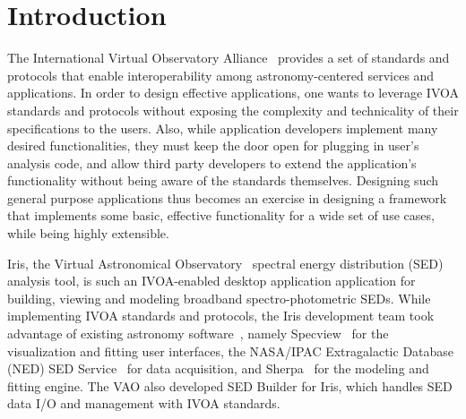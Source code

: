 \documentclass[5p]{elsarticle}
\begin{document}
\section{Introduction}
The International Virtual Observatory Alliance~\citep[IVOA;][]{2004SPIE.5493..137Q} provides a set of standards and protocols that enable interoperability among astronomy-centered services and applications. In order to design effective applications, one wants to leverage IVOA standards and protocols without exposing the complexity and technicality of their specifications to the users. Also, while application developers implement many desired functionalities, they must keep the door open for plugging in user's analysis code, and allow third party developers to extend the application's functionality without being aware of the standards themselves. Designing such general purpose applications thus becomes an exercise in designing a framework that implements some basic, effective functionality for a wide set of use cases, while being highly extensible.


Iris, the Virtual Astronomical Observatory~\citep[VAO;][]{2012SPIE.8449E..0HB} spectral energy distribution (SED) analysis tool, is such an IVOA-enabled desktop application application for building, viewing and modeling broadband spectro-photometric SEDs. While implementing IVOA standards and protocols, the Iris development team took advantage of existing astronomy software~\citep{2012ASPC..461..893D,2013AAS...22124038L}, namely Specview~\citep{2002SPIE.4847..410B} for the visualization and fitting user interfaces, the NASA/IPAC Extragalactic Database (NED) SED Service~\citep{2007ASPC..376..153M} for data acquisition, and Sherpa~\citep{2011ascl.soft07005F} for the modeling and fitting engine. The VAO also developed SED Builder for Iris, which handles SED data I/O and management with IVOA standards. 

\end{document}
